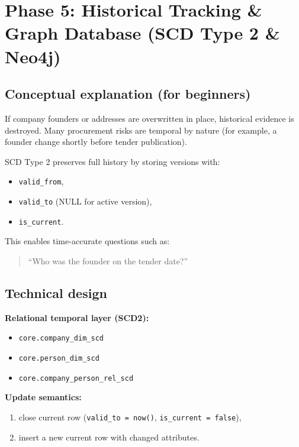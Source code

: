 \documentclass[11pt,a4paper]{article}
\begin{document}
\section{Phase 5: Historical Tracking \& Graph Database (SCD Type 2 \& Neo4j)}

\subsection{Conceptual explanation (for beginners)}
\begin{conceptbox}
If company founders or addresses are overwritten in place, historical evidence is destroyed. Many procurement risks are temporal by nature (for example, a founder change shortly before tender publication).

SCD Type 2 preserves full history by storing versions with:
\begin{itemize}[leftmargin=1.4em]
  \item \texttt{valid\_from},
  \item \texttt{valid\_to} (NULL for active version),
  \item \texttt{is\_current}.
\end{itemize}

This enables time-accurate questions such as:
\begin{quote}
``Who was the founder on the tender date?''
\end{quote}
\end{conceptbox}

\subsection{Technical design}
\textbf{Relational temporal layer (SCD2):}
\begin{itemize}[leftmargin=1.4em]
  \item \texttt{core.company\_dim\_scd}
  \item \texttt{core.person\_dim\_scd}
  \item \texttt{core.company\_person\_rel\_scd}
\end{itemize}

\textbf{Update semantics:}
\begin{enumerate}[leftmargin=1.5em]
  \item close current row (\texttt{valid\_to = now()}, \texttt{is\_current = false}),
  \item insert a new current row with changed attributes.
\end{enumerate}
\end{document}
